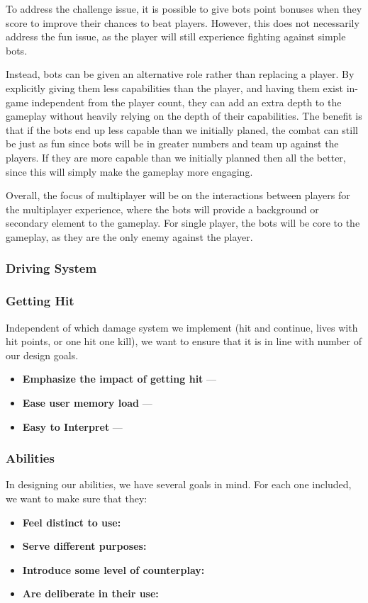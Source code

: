 \documentclass{article}
\theoremstyle{definition}
\begin{document}
To address the challenge issue, it is possible to give bots point bonuses when
they score to improve their chances to beat players. However, this does not
necessarily address the fun issue, as the player will still experience fighting
against simple bots.

Instead, bots can be given an alternative role rather than replacing a player.
By explicitly giving them less capabilities than the player, and having them
exist in-game independent from the player count, they can add an extra depth to
the gameplay without heavily relying on the depth of their capabilities. The
benefit is that if the bots end up less capable than we initially planed, the
combat can still be just as fun since bots will be in greater numbers and team
up against the players. If they are more capable than we initially planned then
all the better, since this will simply make the gameplay more engaging.

Overall, the focus of multiplayer will be on the interactions between players
for the multiplayer experience, where the bots will provide a background or
secondary element to the gameplay. For single player, the bots will be core to
the gameplay, as they are the only enemy against the player.

\subsubsection{Driving System}

\subsubsection{Getting Hit}

Independent of which damage system we implement (hit and continue, lives with
hit points, or one hit one kill), we want to ensure that it is in line with
number of our design goals.
\begin{itemize}
  \item \textbf{Emphasize the impact of getting hit} ---
  \item \textbf{Ease user memory load} ---
  \item \textbf{Easy to Interpret} ---
\end{itemize}

\subsubsection{Abilities}

In designing our abilities, we have several goals in mind. For each one
included, we want to make sure that they:
\begin{itemize}
  \item \textbf{Feel distinct to use:}
  \item \textbf{Serve different purposes:}
  \item \textbf{Introduce some level of counterplay:}
  \item \textbf{Are deliberate in their use:}
\end{itemize}
\end{document}
